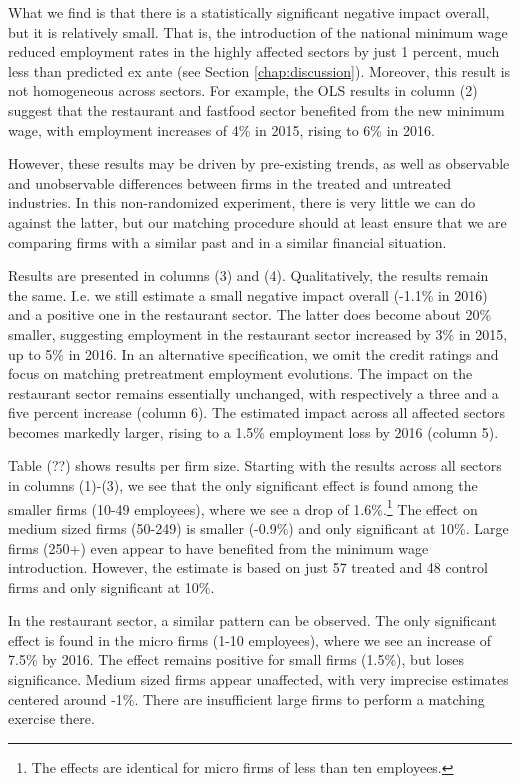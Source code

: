 What we find is that there is a statistically significant negative impact overall, but it is relatively small. That is, the introduction of the national minimum wage reduced employment rates in the highly affected sectors by just 1 percent, much less than predicted ex ante (see Section \ref{chap:discussion}). Moreover, this result is not homogeneous across sectors. For example, the OLS results in column (2) suggest that the restaurant and fastfood sector benefited from the new minimum wage, with employment increases of 4\% in 2015, rising to 6\% in 2016.

However, these results may be driven by pre-existing trends, as well as observable and unobservable differences between firms in the treated and untreated industries. In this non-randomized experiment, there is very little we can do against the latter, but our matching procedure should at least ensure that we are comparing firms with a similar past and in a similar financial situation. 

Results are presented in columns (3) and (4). Qualitatively, the results remain the same. I.e. we still estimate a small negative impact overall (-1.1\% in 2016) and a positive one in the restaurant sector. The latter does become about 20\% smaller, suggesting employment in the restaurant sector increased by 3\% in 2015, up to 5\% in 2016. In an alternative specification, we omit the credit ratings and focus on matching pretreatment employment evolutions. The impact on the restaurant sector remains essentially unchanged, with respectively a three and a five percent increase (column 6). The estimated impact across all affected sectors becomes markedly larger, rising to a 1.5\% employment loss by 2016 (column 5).


Table (??) shows results per firm size. Starting with the results across all sectors in columns (1)-(3), we see that the only significant effect is found among the smaller firms (10-49 employees), where we see a drop of 1.6\%.\footnote{The effects are identical for micro firms of less than ten employees.} The effect on medium sized firms (50-249) is smaller (-0.9\%) and only significant at 10\%. Large firms (250+) even appear to have benefited from the minimum wage introduction. However, the estimate is based on just 57 treated and 48 control firms and only significant at 10\%.

In the restaurant sector, a similar pattern can be observed. The only significant effect is found in the micro firms (1-10 employees), where we see an increase of 7.5\% by 2016. The effect remains positive for small firms (1.5\%), but loses significance. Medium sized firms appear unaffected, with very imprecise estimates centered around -1\%. There are insufficient large firms to perform a matching exercise there.